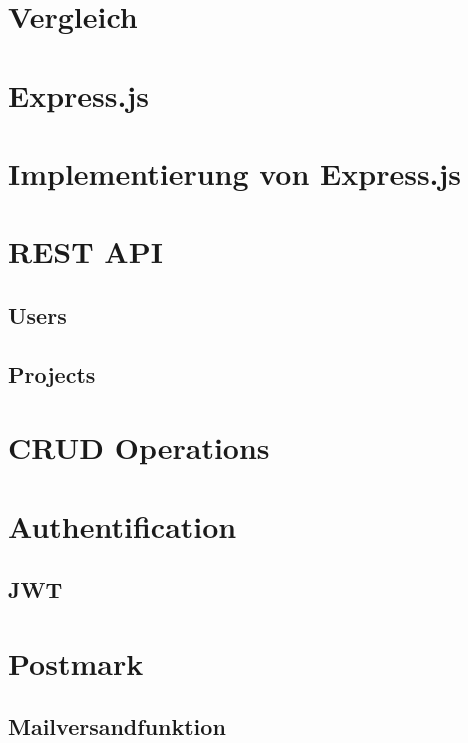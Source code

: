 \section{Vergleich}


\section{Express.js}


\section{Implementierung von Express.js}


\section{REST API}


\subsection{Users}


\subsection{Projects}


\section{CRUD Operations}


\section{Authentification}


\subsection{JWT}


\section{Postmark}


\subsection{Mailversandfunktion}


